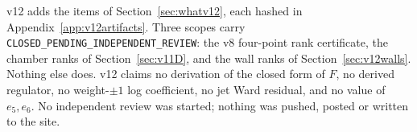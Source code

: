 v12 adds the items of Section~\ref{sec:whatv12}, each hashed in
Appendix~\ref{app:v12artifacts}. Three scopes carry
\texttt{CLOSED\_PENDING\_INDEPENDENT\_REVIEW}: the v8 four-point
rank certificate, the chamber ranks of Section~\ref{sec:v11D}, and
the wall ranks of Section~\ref{sec:v12walls}. Nothing else does.
v12 claims no derivation of the closed form of \(F\), no derived
regulator, no weight-\(\pm1\) log coefficient, no jet Ward residual,
and no value of \(e_5,e_6\). No independent review was started;
nothing was pushed, posted or written to the site.
